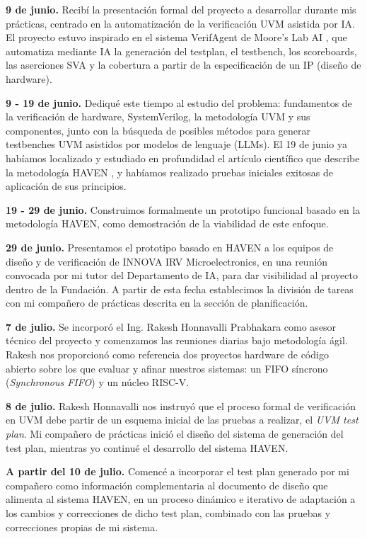 \textbf{9 de junio.} Recibí la presentación formal del proyecto a desarrollar durante mis prácticas, centrado en la automatización de la verificación UVM asistida por IA. El proyecto estuvo inspirado en el sistema VerifAgent de Moore's Lab AI \cite{mooreslab2026}, que automatiza mediante IA la generación del testplan, el testbench, los scoreboards, las aserciones SVA y la cobertura a partir de la especificación de un IP (diseño de hardware).

\textbf{9 - 19 de junio.} Dediqué este tiempo al estudio del problema: fundamentos de la verificación de hardware, SystemVerilog, la metodología UVM y sus componentes, junto con la búsqueda de posibles métodos para generar testbenches UVM asistidos por modelos de lenguaje (LLMs). El 19 de junio ya habíamos localizado y estudiado en profundidad el artículo científico que describe la metodología HAVEN \cite{meng2026}, y habíamos realizado pruebas iniciales exitosas de aplicación de sus principios.

\textbf{19 - 29 de junio.} Construimos formalmente un prototipo funcional basado en la metodología HAVEN, como demostración de la viabilidad de este enfoque.

\textbf{29 de junio.} Presentamos el prototipo basado en HAVEN a los equipos de diseño y de verificación de INNOVA IRV Microelectronics, en una reunión convocada por mi tutor del Departamento de IA, para dar visibilidad al proyecto dentro de la Fundación. A partir de esta fecha establecimos la división de tareas con mi compañero de prácticas descrita en la sección de planificación.

\textbf{7 de julio.} Se incorporó el Ing. Rakesh Honnavalli Prabhakara como asesor técnico del proyecto y comenzamos las reuniones diarias bajo metodología ágil. Rakesh nos proporcionó como referencia dos proyectos hardware de código abierto sobre los que evaluar y afinar nuestros sistemas: un FIFO síncrono (\emph{Synchronous FIFO}) y un núcleo RISC-V.

\textbf{8 de julio.} Rakesh Honnavalli nos instruyó que el proceso formal de verificación en UVM debe partir de un esquema inicial de las pruebas a realizar, el \emph{UVM test plan}. Mi compañero de prácticas inició el diseño del sistema de generación del test plan, mientras yo continué el desarrollo del sistema HAVEN.

\textbf{A partir del 10 de julio.} Comencé a incorporar el test plan generado por mi compañero como información complementaria al documento de diseño que alimenta al sistema HAVEN, en un proceso dinámico e iterativo de adaptación a los cambios y correcciones de dicho test plan, combinado con las pruebas y correcciones propias de mi sistema. 

